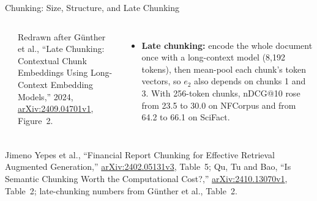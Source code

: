 \begin{frame}{Chunking: Size, Structure, and Late Chunking}
\begin{columns}[T,onlytextwidth]
{{}\\[0.2em]
      {\scriptsize Redrawn after G\"unther et al., ``Late Chunking: Contextual Chunk Embeddings Using Long-Context Embedding Models,'' 2024, \href{https://arxiv.org/abs/2409.04701v1}{arXiv:2409.04701v1}, Figure~2.\par}\par}
      \begin{itemize}\scriptsize
        \item[\textcolor{red}{$\blacktriangleright$}] \textbf{Late chunking:} encode the whole document once with a long-context model (8{,}192 tokens), then mean-pool each chunk's token vectors, so $e_2$ also depends on chunks 1 and 3. With 256-token chunks, nDCG@10 rose from 23.5 to 30.0 on NFCorpus and from 64.2 to 66.1 on SciFact.
      \end{itemize}
  \end{columns}
  \vspace{0.1em}
  {\scriptsize Jimeno Yepes et al., ``Financial Report Chunking for Effective Retrieval Augmented Generation,'' \href{https://arxiv.org/abs/2402.05131v3}{arXiv:2402.05131v3}, Table~5; Qu, Tu and Bao, ``Is Semantic Chunking Worth the Computational Cost?,'' \href{https://arxiv.org/abs/2410.13070v1}{arXiv:2410.13070v1}, Table~2; late-chunking numbers from G\"unther et al., Table~2.\par}
\end{frame}

